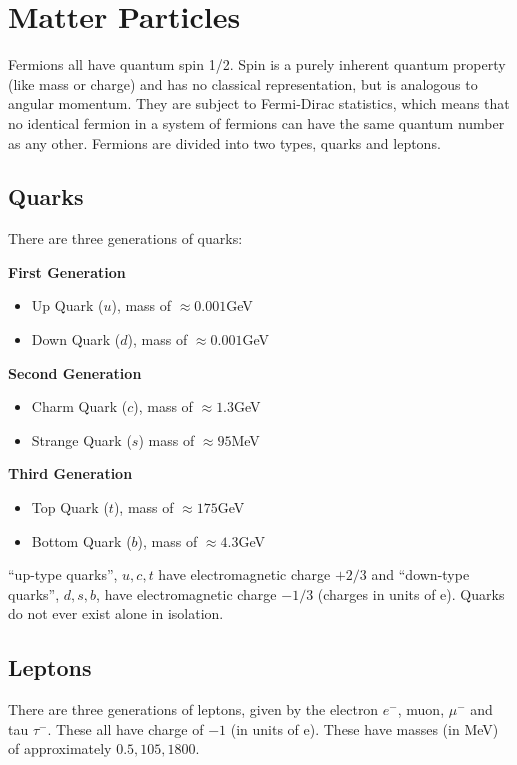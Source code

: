 \section{Matter Particles}
Fermions all have quantum spin 1/2. Spin is a purely inherent quantum property (like mass or charge) and has no classical representation, but is analogous to angular momentum. They are subject to Fermi-Dirac statistics, which means that no identical fermion in a system of fermions can have the same quantum number as any other. Fermions are divided into two types, quarks and leptons.

\subsection{Quarks}
There are three generations of quarks:

\textbf{First Generation}
\begin{itemize}
    \item Up Quark ($u$), mass of $\approx0.001$GeV
    \item Down Quark ($d$), mass of $\approx0.001$GeV
\end{itemize}

\textbf{Second Generation}
\begin{itemize}
    \item Charm Quark ($c$), mass of $\approx1.3$GeV
    \item Strange Quark ($s$) mass of $\approx95$MeV
\end{itemize}

\textbf{Third Generation}
\begin{itemize}
    \item Top Quark ($t$), mass of $\approx175$GeV
    \item Bottom Quark ($b$), mass of $\approx4.3$GeV
\end{itemize}

``up-type quarks'', $u, c, t$ have electromagnetic charge $+2/3$ and ``down-type quarks'', $d, s, b$, have electromagnetic charge $-1/3$ (charges in units of e). Quarks do not ever exist alone in isolation.

\subsection{Leptons}

There are three generations of leptons, given by the electron $e^-$, muon, $\mu^-$ and tau $\tau^-$. These all have charge of $-1$ (in units of e). These have masses (in MeV) of approximately $0.5, 105, 1800$.

